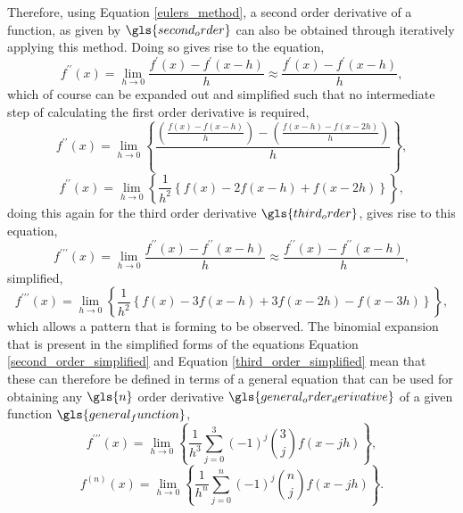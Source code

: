 Therefore, using Equation \ref{eulers_method}, a second order derivative of a function, as given by $\gls{second_order}$ can also be obtained through iteratively applying this method. Doing so gives rise to the equation,
\begin{equation}\label{second_order}
	f^{\prime\prime}(x)= \lim_{h \to 0} \frac{f^{\prime}(x)-f^{\prime}(x-h)}{h} \approx \frac{f^{\prime}(x)-f^{\prime}(x-h)}{h},
\end{equation}
which of course can be expanded out and simplified such that no intermediate step of calculating the first order derivative is required,
\begin{equation}\label{second_order_expanded}
	f^{\prime\prime}(x) = \lim_{h \to 0} \left\{\frac{\left(\frac{f(x)-f(x-h)}{h}\right)-\left(\frac{f(x-h)-f(x-2h)}{h}\right)}{h}\right\},
\end{equation}
\begin{equation}\label{second_order_simplified}
	f^{\prime\prime}(x) = \lim_{h \to 0} \left\{\frac{1}{h^{2}}\left\{f(x)-2f(x-h)+f(x-2h)\right\}\right\},
\end{equation}
doing this again for the third order derivative $\gls{third_order}$, gives rise to this equation,
\begin{equation}\label{third_order}
	f^{\prime\prime\prime}(x)= \lim_{h \to 0} \frac{f^{\prime\prime}(x)-f^{\prime\prime}(x-h)}{h} \approx \frac{f^{\prime\prime}(x)-f^{\prime\prime}(x-h)}{h},
\end{equation}
simplified, 
\begin{equation}\label{third_order_simplified}
	f^{\prime\prime\prime}(x) = \lim_{h \to 0} \left\{\frac{1}{h^{2}}\left\{f(x)-3f(x-h)+3f(x-2h)-f(x-3h)\right\}\right\},
\end{equation}
which allows a pattern that is forming to be observed. The binomial expansion that is present in the simplified forms of the equations Equation \ref{second_order_simplified} and Equation \ref{third_order_simplified} mean that these can therefore be defined in terms of a general equation that can be used for obtaining any $\gls{n}$ order derivative $\gls{general_order_derivative}$ of a given function $\gls{general_function}$,
\begin{equation}\label{third_order_generified}
	f^{\prime\prime\prime}(x) = \lim_{h \to 0} \left\{\frac{1}{h^{3}}\sum_{j=0}^{3} (-1)^{j} {3 \choose j} f(x-jh)\right\},
\end{equation}
\begin{equation}\label{general_order}
	f^{(n)}(x) = \lim_{h \to 0} \left\{\frac{1}{h^{n}}\sum_{j=0}^{n} (-1)^{j} {n \choose j} f(x-jh)\right\}.
\end{equation}

